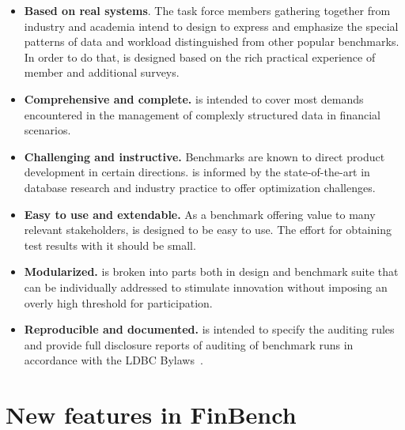 \begin{itemize}
      \item \textbf{Based on real systems}. The task force members gathering
            together from industry and academia intend to design \ldbcfinbench
            to express and emphasize the special patterns of data and workload
            distinguished from other popular benchmarks. In order to do that,
            \ldbcfinbench is designed based on the rich practical experience of
            member and additional surveys.
      \item \textbf{Comprehensive and complete.} \ldbcfinbench is intended to
            cover most demands encountered in the management of complexly
            structured data in financial scenarios.
      \item \textbf{Challenging and instructive.} Benchmarks are known to direct
            product development in certain directions. \ldbcfinbench is informed
            by the state-of-the-art in database research and industry practice
            to offer optimization challenges.
      \item \textbf{Easy to use and extendable.} As a benchmark offering value
            to many relevant stakeholders, \ldbcfinbench is designed to be easy
            to use. The effort for obtaining test results with it should be
            small.
      \item \textbf{Modularized.} \ldbcfinbench is broken into parts both in
            design and benchmark suite that can be individually addressed to
            stimulate innovation without imposing an overly high threshold for
            participation.
      \item \textbf{Reproducible and documented.} \ldbcfinbench is intended to
            specify the auditing rules and provide full disclosure reports of
            auditing of benchmark runs in accordance with the LDBC
            Bylaws~\cite{ldbc_byelaws}.
\end{itemize}



\section{New features in FinBench}

